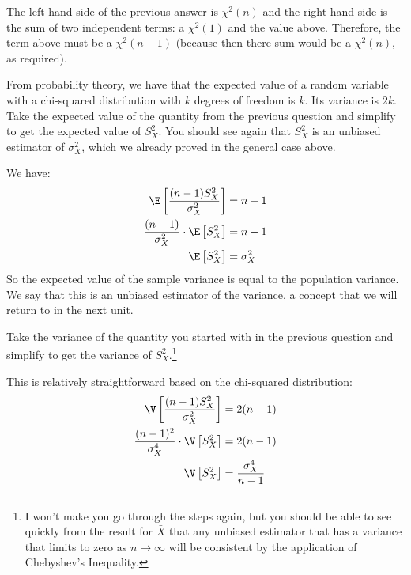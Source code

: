
The left-hand side of the previous answer is $\chi^2(n)$ and the right-hand
side is the sum of two independent terms: a $\chi^2(1)$ and the value above. Therefore,
the term above must be a $\chi^2(n-1)$ (because then there sum would be a $\chi^2(n)$,
as required). 


From probability theory, we have that the expected value of a random variable with
a chi-squared distribution with $k$ degrees of freedom is $k$. Its variance is $2k$.
Take the expected value of the quantity from the previous question and
simplify to get the expected value of $S_X^2$. You should see again that $S_X^2$ is
an unbiased estimator of $\sigma_X^2$, which we already proved in the general case
above.


We have:
\begin{align*}
\E \left[ \frac{(n-1) S_X^2}{\sigma_X^2} \right] &= n-1 \\
\frac{(n-1)}{\sigma_X^2} \cdot \E \left[ S_X^2 \right] &= n-1 \\
\E \left[ S_X^2 \right] &= \sigma_X^2
\end{align*}
So the expected value of the sample variance is equal to the population variance.
We say that this is an unbiased estimator of the variance, a concept that we will
return to in the next unit.


Take the variance of the quantity you started with in the previous question and
simplify to get the variance of $S_X^2$.\footnote{
  I won't make you go through the steps again, but you should be able to see
  quickly from the result for $\bar{X}$ that any unbiased estimator that has
  a variance that limits to zero as $n\rightarrow\infty$ will be consistent
  by the application of Chebyshev's Inequality.
}


This is relatively straightforward based on the chi-squared distribution:
\begin{align*}
\V \left[ \frac{(n-1) S_X^2}{\sigma_X^2} \right] &= 2(n-1) \\
\frac{(n-1)^2}{\sigma_X^4} \cdot \V \left[ S_X^2 \right] &= 2(n-1) \\
\V \left[ S_X^2 \right] &= \frac{\sigma_X^4}{n-1}
\end{align*}

